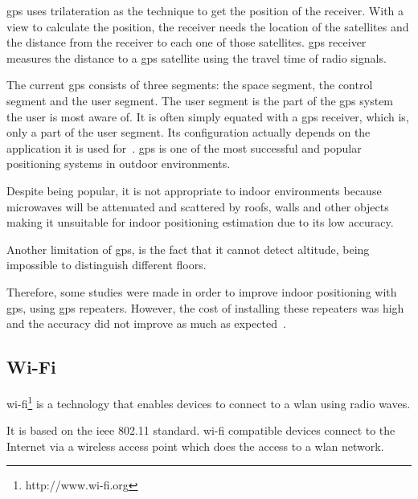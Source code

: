 \gls{gps} uses trilateration as the technique to get the position of the receiver. With a view to calculate the position, the receiver needs the location of the satellites and the distance from the receiver to each one of those satellites. \gls{gps} receiver measures the distance to a \gls{gps} satellite using the travel time of radio signals.

The current \gls{gps} consists of three segments: the space segment, the control segment and the user segment.
The user segment is the part of the \gls{gps} system the user is most aware of. It is often simply equated with a \gls{gps} receiver, which is, only a part of the user segment. Its configuration actually depends on the application it is used for~\citep{KupperAxel}.
\gls{gps} is one of the most successful and popular positioning systems in outdoor environments. 

Despite being popular, it is not appropriate to indoor environments because microwaves will be attenuated and scattered by roofs, walls and other objects making it unsuitable for indoor positioning estimation due to its low accuracy. 


Another limitation of \gls{gps}, is the fact that it cannot detect altitude, being impossible to distinguish different floors.

Therefore, some studies were made in order to improve indoor positioning with \gls{gps}, using \gls{gps} repeaters. However, the cost of installing these repeaters was high and the accuracy did not improve as much as expected~\citep{GPStransmitters}.

\subsection{Wi-Fi}
\label{subsection:wifi}
\gls{wi-fi}\footnote{http://www.wi-fi.org} is a technology that enables devices to connect to a \gls{wlan} using radio waves.

It is based on the \gls{ieee} 802.11 standard.
\gls{wi-fi} compatible devices connect to the Internet via a wireless access point which does the access to a \gls{wlan} network. 

